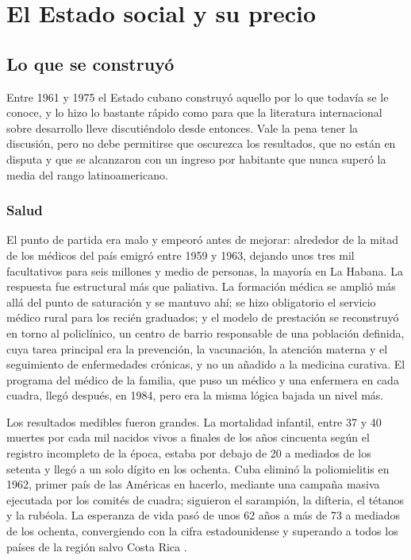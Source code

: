 \chapter{El Estado social y su precio}
\label{ch:socialstate}

\section{Lo que se construyó}

Entre 1961 y 1975 el Estado cubano construyó aquello por lo que todavía se le
conoce, y lo hizo lo bastante rápido como para que la literatura internacional
sobre desarrollo lleve discutiéndolo desde entonces. Vale la pena tener la
discusión, pero no debe permitirse que oscurezca los resultados, que no están en
disputa y que se alcanzaron con un ingreso por habitante que nunca superó la
media del rango latinoamericano.

\subsection{Salud}

El punto de partida era malo y empeoró antes de mejorar: alrededor de la mitad de
los médicos del país emigró entre 1959 y 1963, dejando unos tres mil facultativos
para seis millones y medio de personas, la mayoría en La Habana. La respuesta fue
estructural más que paliativa. La formación médica se amplió más allá del punto
de saturación y se mantuvo ahí; se hizo obligatorio el servicio médico rural para
los recién graduados; y el modelo de prestación se reconstruyó en torno al
policlínico, un centro de barrio responsable de una población definida, cuya
tarea principal era la prevención, la vacunación, la atención materna y el
seguimiento de enfermedades crónicas, y no un añadido a la medicina curativa. El
programa del médico de la familia, que puso un médico y una enfermera en cada
cuadra, llegó después, en 1984, pero era la misma lógica bajada un nivel más.

Los resultados medibles fueron grandes. La mortalidad infantil, entre 37 y 40
muertes por cada mil nacidos vivos a finales de los años cincuenta según el
registro incompleto de la época, estaba por debajo de 20 a mediados de los setenta
y llegó a un solo dígito en los ochenta.\unv{} Cuba eliminó la poliomielitis en
1962, primer país de las Américas en hacerlo, mediante una campaña masiva
ejecutada por los comités de cuadra; siguieron el sarampión, la difteria, el
tétanos y la rubéola. La esperanza de vida pasó de unos 62 años a más de 73 a
mediados de los ochenta, convergiendo con la cifra estadounidense y superando a
todos los países de la región salvo Costa Rica \citep{onei,feinsilver1993}.\unv{}

